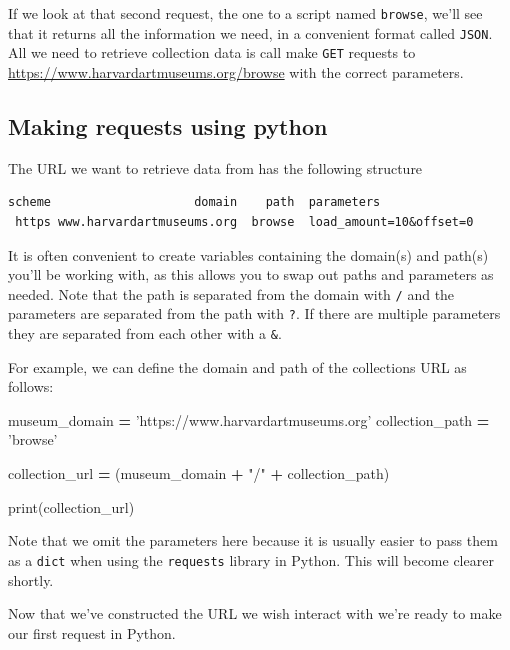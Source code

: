 \documentclass[]{book}
\newenvironment{Shaded}{\begin{snugshade}}{\end{snugshade}}
\newcommand{\StringTok}[1]{\textcolor[rgb]{0.31,0.60,0.02}{#1}}
\newcommand{\OperatorTok}[1]{\textcolor[rgb]{0.81,0.36,0.00}{\textbf{#1}}}
\newcommand{\BuiltInTok}[1]{#1}
\newcommand{\NormalTok}[1]{#1}
\begin{document}
If we look at that second request, the one to a script named
\texttt{browse}, we'll see that it returns all the information we need,
in a convenient format called \texttt{JSON}. All we need to retrieve
collection data is call make \texttt{GET} requests to
\url{https://www.harvardartmuseums.org/browse} with the correct
parameters.

\subsection{Making requests using
python}\label{making-requests-using-python}

The URL we want to retrieve data from has the following structure

\begin{verbatim}
scheme                    domain    path  parameters
 https www.harvardartmuseums.org  browse  load_amount=10&offset=0
\end{verbatim}

It is often convenient to create variables containing the domain(s) and
path(s) you'll be working with, as this allows you to swap out paths and
parameters as needed. Note that the path is separated from the domain
with \texttt{/} and the parameters are separated from the path with
\texttt{?}. If there are multiple parameters they are separated from
each other with a \texttt{\&}.

For example, we can define the domain and path of the collections URL as
follows:

\begin{Shaded}
\begin{Highlighting}[]
\NormalTok{museum_domain }\OperatorTok{=} \StringTok{'https://www.harvardartmuseums.org'}
\NormalTok{collection_path }\OperatorTok{=} \StringTok{'browse'}

\NormalTok{collection_url }\OperatorTok{=}\NormalTok{ (museum_domain}
                  \OperatorTok{+} \StringTok{"/"}
                  \OperatorTok{+}\NormalTok{ collection_path)}

\BuiltInTok{print}\NormalTok{(collection_url)}
\end{Highlighting}
\end{Shaded}

Note that we omit the parameters here because it is usually easier to
pass them as a \texttt{dict} when using the \texttt{requests} library in
Python. This will become clearer shortly.

Now that we've constructed the URL we wish interact with we're ready to
make our first request in Python.
\end{document}
